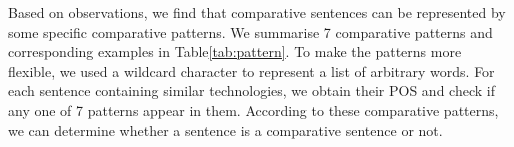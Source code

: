 Based on observations, we find that comparative sentences can be represented by some specific comparative patterns. 
We summarise 7 comparative patterns and corresponding examples in Table\ref{tab:pattern}.
To make the patterns more  flexible, we used a wildcard character to represent a list of arbitrary words. 
For each sentence containing similar technologies, we obtain their POS and check if any one of 7 patterns appear in them.
According to these comparative patterns, we can determine whether a sentence is a comparative sentence or not. 

